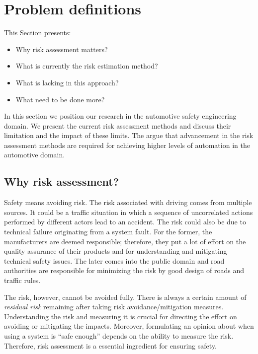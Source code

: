 \section{Problem definitions}
\label{sec:problem} %

This Section presents: 
\begin{itemize}
	\item Why risk assessment matters?
	\item What is currently the risk estimation method? 
	\item What is lacking in this approach? 
	\item What need to be done more? 
\end{itemize}

In this section we position our research in the automotive safety engineering domain. 
We present the current risk assessment methods and discuss their limitation and the impact of these limits.
The argue that advancement in the risk assessment methods are required for achieving higher levels of automation in the automotive domain. 

\subsection{Why risk assessment?}

Safety means avoiding risk. 
The risk associated with driving comes from multiple sources. 
It could be a traffic situation in which a sequence of uncorrelated actions performed by different actors lead to an accident. 
The risk could also be due to technical failure originating from a system fault. 
For the former, the manufacturers are deemed responsible; 
	therefore, they put a lot of effort on the quality  assurance of their products 
		and for understanding and mitigating technical safety issues.  
The later comes into the public domain and road authorities are responsible for minimizing the risk by good design of roads and traffic rules. 

The  risk, however, cannot be avoided fully. 
There is always a certain amount of \textit{residual risk} remaining after taking risk avoidance/mitigation measures. 
Understanding the risk and measuring it is crucial for directing the effort on avoiding or mitigating the impacts. 
Moreover, formulating an opinion about when using a system is ``safe enough'' depends on the ability to measure the risk. 
Therefore, risk assessment is a essential ingredient for ensuring safety.
	

